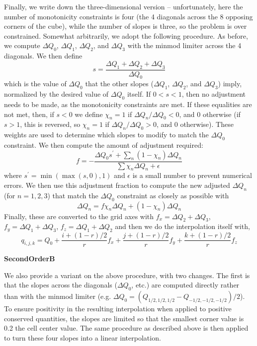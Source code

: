 Finally, we write down the three-dimensional version -- unfortunately, here the number of monotonicity constraints is four (the 4 diagonals across the 8 opposing corners of the cube), while the number of slopes is three, so the problem is over constrained.  Somewhat arbitrarily, we adopt the following procedure.  As before, we compute $\Delta Q_0$, $\Delta Q_1$, $\Delta Q_2$, and $\Delta Q_3$ with the minmod limiter across the 4 diagonals.  We then define
\begin{equation}
s =\frac{\Delta Q_1 + \Delta Q_2 + \Delta Q_3}{\Delta Q_0}
\end{equation}
which is the value of $\Delta Q_0$ that the other slopes ($\Delta Q_1$, $\Delta Q_2$, and $\Delta Q_3$) imply, normalized by the desired value of $\Delta Q_0$ itself.  If $0 < s < 1$, then no adjustment needs to be made, as the monotonicity constraints are met.  If these equalities are not met, then, if $s<0$ we define $\chi_n = 1$ if $\Delta Q_n/\Delta Q_0 < 0$, and 0 otherwise (if $s > 1$, this is reversed, so $\chi_n = 1$ if $\Delta Q_n/\Delta Q_0 > 0$, and 0 otherwise).  These weights are used to determine which slopes to modify to match the $\Delta Q_0$ constraint.  We then compute the amount of adjustment required:
\begin{equation}
f = - \frac{\Delta Q_0 s^\prime + \sum_n (1-\chi_n) \Delta Q_n}{\sum \chi_n \Delta Q_n + \epsilon}
\end{equation}
where $s^\prime = \min(\max(s,0), 1)$ and $\epsilon$ is a small number to prevent numerical errors. We then use this adjustment fraction to compute the new adjusted $\Delta Q_n$ (for $n = 1, 2, 3$) that match the $\Delta Q_0$ constraint as closely as possible with
\begin{equation}
\Delta Q_n = f \chi_n \Delta Q_n + (1-\chi_n) \Delta Q_n
\end{equation}
Finally, these are converted to the grid axes with $f_x = \Delta Q_2 + \Delta Q_3$, $f_y = \Delta Q_1 + \Delta Q_3$, $f_z = \Delta Q_1 + \Delta Q_2$ and then we do the interpolation itself with,
\begin{equation}
q_{i,j,k} = Q_0 + \frac{i+(1-r)/2}{r} f_x + \frac{j+(1-r)/2}{r} f_y + \frac{k+(1-r)/2}{r} f_z
\end{equation}


\vspace{0.3cm}\noindent
{\bf SecondOrderB} 

We also provide a variant on the above procedure, with two changes.  The first is that the slopes across the diagonals ($\Delta Q_0$, etc.) are computed directly rather than with the minmod limiter (e.g. $\Delta Q_0 = (Q_{1/2,1/2,1/2} - Q_{-1/2,-1/2,-1/2})/2$).  To ensure positivity in the resulting interpolation when applied to positive conserved quantities, the slopes are limited so that the smallest corner value is 0.2 the cell center value.  The same procedure as described above is then applied to turn these four slopes into a linear interpolation.


